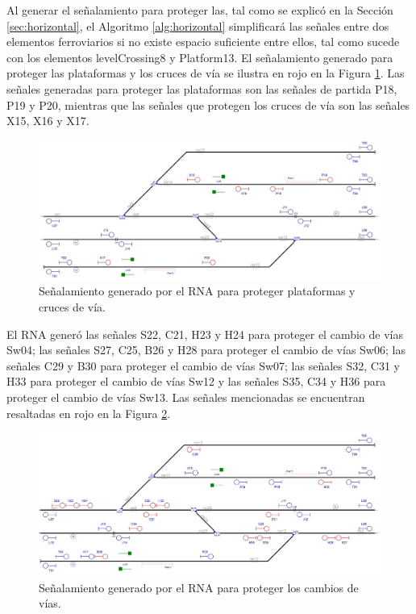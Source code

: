 	Al generar el señalamiento para proteger las, tal como se explicó en la Sección \ref{sec:horizontal}, el Algoritmo 	\ref{alg:horizontal} simplificará las señales entre dos elementos ferroviarios si no existe espacio suficiente entre ellos, tal como sucede con los elementos levelCrossing8 y Platform13. El señalamiento generado para proteger las plataformas y los cruces de vía se ilustra en rojo en la Figura \ref{fig:EJ1_5}. Las señales generadas para proteger las plataformas son las señales de partida P18, P19 y P20, mientras que las señales que protegen los cruces de vía son las señales X15, X16 y X17.
		
	\begin{figure}[H]
		\centering
		\includegraphics[width=1\textwidth]{resultados-obtenidos/ejemplo1/images/1_step3.png}
		\centering\caption{Señalamiento generado por el RNA para proteger plataformas y cruces de vía.}
		\label{fig:EJ1_5}
	\end{figure}
	
	El RNA generó las señales S22, C21, H23 y H24 para proteger el cambio de vías Sw04; las señales S27, C25, B26 y H28 para proteger el cambio de vías Sw06; las señales C29 y B30 para proteger el cambio de vías Sw07; las señales S32, C31 y H33 para proteger el cambio de vías Sw12 y las señales S35, C34 y H36 para proteger el cambio de vías Sw13. Las señales mencionadas se encuentran resaltadas en rojo en la Figura \ref{fig:EJ1_6}.
	
	\begin{figure}[H]
		\centering
		\includegraphics[width=1\textwidth]{resultados-obtenidos/ejemplo1/images/1_step4.png}
		\centering\caption{Señalamiento generado por el RNA para proteger los cambios de vías.}
		\label{fig:EJ1_6}
	\end{figure}
	
